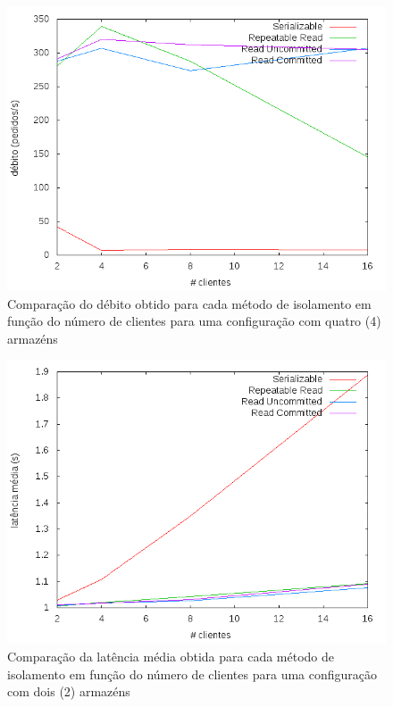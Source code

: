 \begin{figure}[!h]
\centering
\includegraphics[scale=.5]{img/questao-1/diff-deb-4-arm}
\caption{Comparação do débito obtido para cada método de isolamento em função do número de clientes para uma configuração com quatro (4) armazéns}
\end{figure}

\newpage

\begin{figure}[!h]
\centering
\includegraphics[scale=.5]{img/questao-1/diff-lat-med-2-arm}
\caption{Comparação da latência média obtida para cada método de isolamento em função do número de clientes para uma configuração com dois (2) armazéns}
\end{figure}


